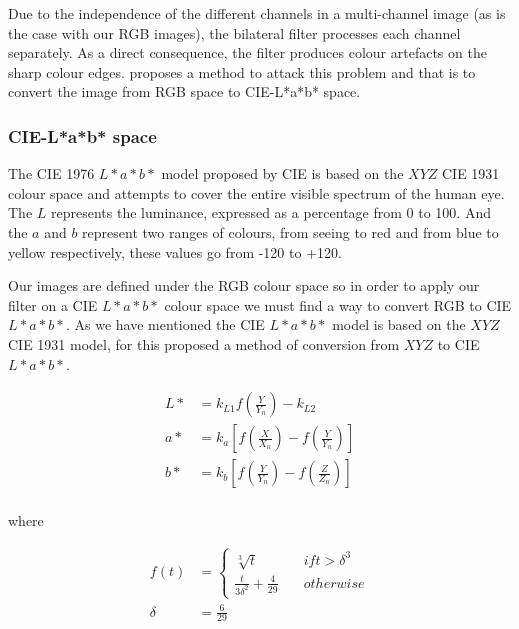\documentclass[titlepage,12pt]{report}
\begin{document}
Due to the independence of the different channels in a multi-channel image (as is the case with our RGB images), the bilateral filter processes each channel separately. As a direct consequence, the filter produces colour artefacts on the sharp colour edges. \citep[pp.~839--846]{Tomasi1998} proposes a method to attack this problem and that is to convert the image from RGB space to CIE-L*a*b* space. 

\subsubsection{CIE-L*a*b* space}

The CIE 1976 $L*a*b*$ model proposed by CIE is based on the $XYZ$ CIE 1931 colour space and attempts to cover the entire visible spectrum of the human eye. The $L$ represents the luminance, expressed as a percentage from 0 to 100. And the $a$ and $b$ represent two ranges of colours, from seeing to red and from blue to yellow respectively, these values go from -120 to +120.

Our images are defined under the RGB colour space so in order to apply our filter on a CIE $L*a*b*$ colour space we must find a way to convert RGB to CIE $L*a*b*$. As we have mentioned the CIE $L*a*b*$ model is based on the $XYZ$ CIE 1931 model, for this \citep[pp.~167--170]{Robertson1990} proposed a method of conversion from $XYZ$ to CIE $L*a*b*$.

\begin{equation} 
\begin{split}
L* & = k_{L1} f \left( \frac{Y}{Y_n} \right) - k_{L2} \\
a* & = k_a \left[ f \left( \frac{X}{X_n} \right) - f \left( \frac{Y}{Y_n} \right)  \right] \\
b* & = k_b \left[ f \left( \frac{Y}{Y_n} \right) - f \left( \frac{Z}{Z_n} \right) \right] \\
\end{split}
\end{equation}

where

\begin{equation}
\begin{split}
f(t) & = 
\begin{cases}
	\sqrt[3]{t} &\quad if t > \delta^3\\
	\frac{t}{3 \delta^2} + \frac{4}{29} & \quad otherwise
\end{cases} \\
\delta & = \frac{6}{29} \\
\end{split}
\end{equation}
\end{document}
